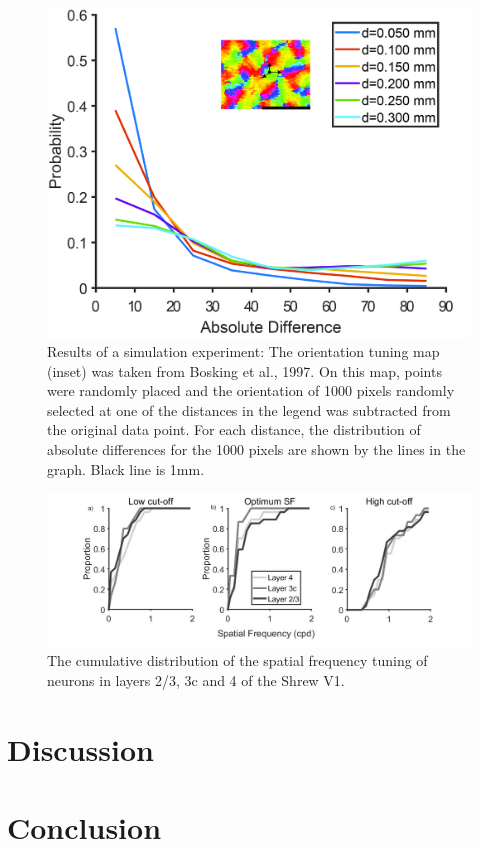 		\begin{figure}[H]
		
		\includegraphics[width=\linewidth]{ShrewV1/simulation.jpg}
		\caption{Results of a simulation experiment: The orientation tuning map (inset) was taken from Bosking et al., 1997. On this map, points were randomly placed and the orientation of 1000 pixels randomly selected at one of the distances in the legend was subtracted from the original data point. For each distance, the distribution of absolute differences for the 1000 pixels are shown by the lines in the graph. Black line is 1mm.}
		\label{fig:sim}
	\end{figure}
	
		\begin{figure}[H]
		
		\includegraphics[width=\linewidth]{ShrewV1/sftuning_neurons.jpg}
		\caption{The cumulative distribution of the spatial frequency tuning of neurons in layers 2/3, 3c and 4 of the Shrew V1.}
		\label{fig:sftuning}
	\end{figure}
\section{Discussion}
\section{Conclusion}